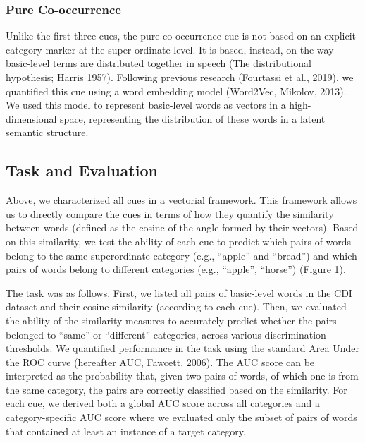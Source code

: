 \documentclass[10pt, letterpaper]{article}
\begin{document}
\hypertarget{pure-co-occurrence}{%
\subsubsection{Pure Co-occurrence}\label{pure-co-occurrence}}

Unlike the first three cues, the pure co-occurrence cue is not based on
an explicit category marker at the super-ordinate level. It is based,
instead, on the way basic-level terms are distributed together in speech
(The distributional hypothesis; Harris 1957). Following previous
research (Fourtassi et al., 2019), we quantified this cue using a word
embedding model (Word2Vec, Mikolov, 2013). We used this model to
represent basic-level words as vectors in a high-dimensional space,
representing the distribution of these words in a latent semantic
structure.

\hypertarget{task-and-evaluation}{%
\subsection{Task and Evaluation}\label{task-and-evaluation}}

Above, we characterized all cues in a vectorial framework. This
framework allows us to directly compare the cues in terms of how they
quantify the similarity between words (defined as the cosine of the
angle formed by their vectors). Based on this similarity, we test the
ability of each cue to predict which pairs of words belong to the same
superordinate category (e.g., ``apple'' and ``bread'') and which pairs
of words belong to different categories (e.g., ``apple'', ``horse'')
(Figure 1).

The task was as follows. First, we listed all pairs of basic-level words
in the CDI dataset and their cosine similarity (according to each cue).
Then, we evaluated the ability of the similarity measures to accurately
predict whether the pairs belonged to ``same'' or ``different''
categories, across various discrimination thresholds. We quantified
performance in the task using the standard Area Under the ROC curve
(hereafter AUC, Fawcett, 2006). The AUC score can be interpreted as the
probability that, given two pairs of words, of which one is from the
same category, the pairs are correctly classified based on the
similarity. For each cue, we derived both a global AUC score across all
categories and a category-specific AUC score where we evaluated only the
subset of pairs of words that contained at least an instance of a target
category.
\end{document}
